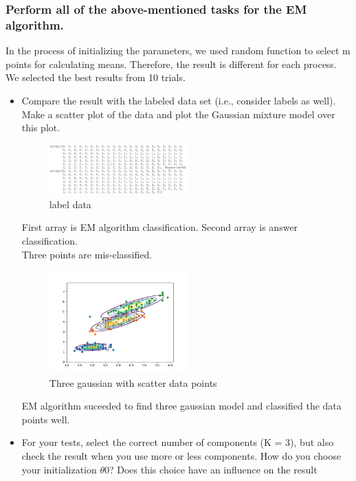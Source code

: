 \documentclass[a4paper]{article}
\begin{document}
	\subsubsection{Perform all of the above-mentioned tasks for the EM algorithm.}
	In the process of initializing the parameters, we used random function to select m points for calculating means. Therefore, the result is different for each process. We selected the best results from 10 trials. 
	\begin{itemize}
	\item Compare the result with the labeled data set (i.e., consider labels as well). Make a scatter plot of the data and plot the Gaussian mixture model over this plot.
	
	\begin{figure}[h]
		\begin{center}
			\includegraphics[width=0.5\textwidth]{number_diff.png}
			\caption{label data}
		\end{center}
	\end{figure}
	First array is EM algorithm classification. Second array is answer classification.\\
	Three points are mis-classified.
	
	\begin{figure}[h]
		\begin{center}
			\includegraphics[width=0.5\textwidth]{gauss.png}
			\caption{Three gaussian with scatter data points}
		\end{center}
	\end{figure}
	
	EM algorithm suceeded to find three gaussian model and classified the data points well.

	\clearpage
	\item For your tests, select the correct number of components (K = 3), but also check the result when you use more or less components. How do you choose your initialization $\theta$0? Does this choice have an inﬂuence on the result
	

\end{itemize}
\end{document}
